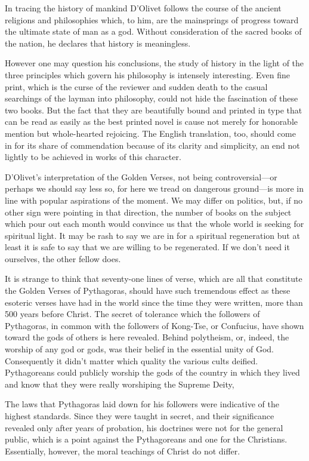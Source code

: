In tracing the history of mankind D'Olivet follows the course of the ancient religions and philosophies which, to him, are the mainsprings of progress toward the ultimate state of man as a god. Without consideration of the sacred books of the nation, he declares that history is meaningless.

However one may question his conclusions, the study of history in the light of the three principles which govern his philosophy is intensely interesting. Even fine print, which is the curse of the reviewer and sudden death to the casual searchings of the layman into philosophy, could not hide the fascination of these two books. But the fact that they are beautifully bound and printed in type that can be read as easily as the best printed novel is cause not merely for honorable mention but whole-hearted rejoicing. The English translation, too, should come in for its share of commendation because of its clarity and simplicity, an end not lightly to be achieved in works of this character.

D'Olivet's interpretation of the Golden Verses, not being controversial—or perhaps we should say less so, for here we tread on dangerous ground—is more in line with popular aspirations of the moment. We may differ on politics, but, if no other sign were pointing in that direction, the number of books on the subject which pour out each month would convince us that the whole world is seeking for spiritual light. It may be rash to say we are in for a spiritual regeneration but at least it is safe to say that we are willing to be regenerated. If we don't need it ourselves, the other fellow does.

It is strange to think that seventy-one lines of verse, which are all that constitute the Golden Verses of Pythagoras, should have such tremendous effect as these esoteric verses have had in the world since the time they were written, more than 500 years before Christ. The secret of tolerance which the followers of Pythagoras, in common with the followers of Kong-Tse, or Confucius, have shown toward the gods of others is here revealed. Behind polytheism, or, indeed, the worship of any god or gods, was their belief in the essential unity of God. Consequently it didn't matter which quality the various cults deified. Pythagoreans could publicly worship the gods of the country in which they lived and know that they were really worshiping the Supreme Deity,

The laws that Pythagoras laid down for his followers were indicative of the highest standards. Since they were taught in secret, and their significance revealed only after years of probation, his doctrines were not for the general public, which is a point against the Pythagoreans and one for the Christians. Essentially, however, the moral teachings of Christ do not differ.

